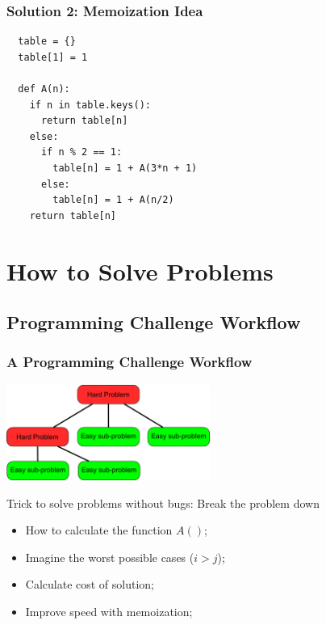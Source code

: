 \begin{frame}[fragile]
  \frametitle{Solution 2: Memoization Idea}
\begin{verbatim}
  table = {}
  table[1] = 1

  def A(n):
    if n in table.keys():
      return table[n]
    else:
      if n % 2 == 1:
        table[n] = 1 + A(3*n + 1)
      else:
        table[n] = 1 + A(n/2)
    return table[n]
\end{verbatim}
\end{frame}

\section{How to Solve Problems}
\subsection{Programming Challenge Workflow}
\begin{frame}
  \frametitle{A Programming Challenge Workflow}

  \begin{center}
    \includegraphics[width=0.5\textwidth]{../img/breakingtheproblem}
  \end{center}

  Trick to solve problems without bugs: Break the problem down
  \bigskip

  \begin{itemize}
  \item How to calculate the function $A()$;
  \item Imagine the worst possible cases ($i > j$);
  \item Calculate cost of solution;
  \item Improve speed with memoization;
  \end{itemize}
\end{frame}

